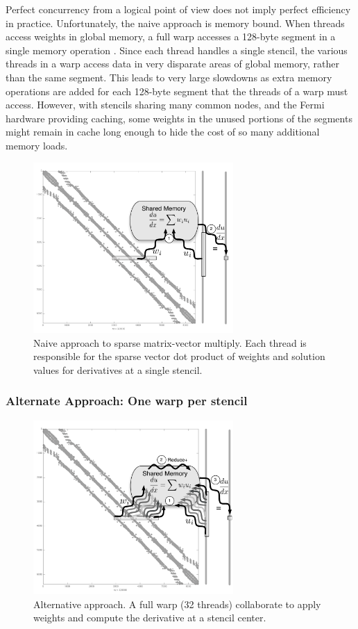 \documentclass{report}
\begin{document}
Perfect concurrency from a logical point of view does not 
imply perfect efficiency in practice. 
Unfortunately, the naive approach 
is memory bound. When threads access weights in global memory, 
a full warp accesses a 128-byte segment in a single memory operation \cite{CudaGuide2011}.
Since each thread handles a single stencil, the various threads in a warp access data in very disparate areas of global memory, rather than the same segment. This leads to very large slowdowns as extra memory operations are added for each 128-byte segment that the threads of a warp must access.
However, with stencils sharing many common nodes, and the Fermi hardware providing caching, some weights in the unused portions of the segments might remain in cache long enough to hide the cost of so many additional memory loads. 



\begin{figure}[htbp]
      \centering
       \includegraphics[width=3in]{../figures/paper1/figures/omnigraffle/oneThreadPerStencil_GRAY.pdf}
      \caption{Naive approach to sparse matrix-vector multiply. Each thread is responsible for the sparse vector dot product of weights and solution values for derivatives at a single stencil.  }
      \label{fig:oneThreadPerStencil}
\end{figure}


\subsubsection{Alternate Approach: One warp per stencil} 

\begin{figure}[htbp]
      \centering
       \includegraphics[width=3in]{../figures/paper1/figures/omnigraffle/oneWarpPerStencil_GRAY.pdf}
      \caption{Alternative approach. A full warp (32 threads) collaborate to apply weights  and compute the derivative at a stencil center. }
      \label{fig:oneWarpPerStencil}
\end{figure}
\end{document}
